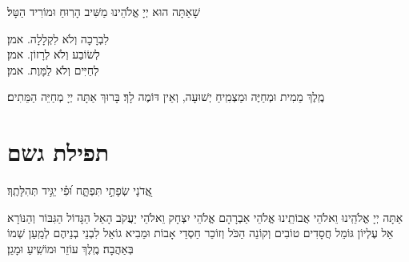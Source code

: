 \documentclass[twoside, openany, parskip=half, 11pt]{book}
\begin{document}
\begin{large}
שָׁאַתָּה הוּא יְיָ אֱלֹהֵינוּ מַשִּׁיב הָרֽוּחַ וּמוֹרִיד הַטָּל׃

לִבְרָכָה וְלֹא לִקְלָלָה. \hfill אמן׃\\
לְשׂוֹבַע וְלֹא לְרָזוֹן. \hfill אמן׃\\
לְחַיִּים וְלֹא לַמָּוֶת. \hfill אמן׃

\end{large}


מֶֽלֶךְ מֵמִית וּמְחַיֶּה וּמַצְמִֽיחַ יְשׁוּעָה, וְאֵין דּוֹמֶה לָךְ׃ בָּרוּךְ אַתָּה יְיָ מְחַיֵּה הַמֵּתִים׃





\section[תפילת גשם]{ תפילת גשם }

\label{tefilasgeshem}


\begin{small}
אֲ֭דֹנָי שְׂפָתַ֣י תִּפְתָּ֑ח וּ֝פִ֗י יַגִּ֥יד תְּהִלָּתֶֽךָ׃\\
\end{small}
אַתָּה יְיָ אֱלֹהֵֽינוּ וֵאלֹהֵי אֲבוֹתֵֽינוּ אֱלֹהֵי אַבְרָהָם אֱלֹהֵי יִצְחָק וֵאלֹהֵי יַעֲקֹב הָאֵל הַגָּדוֹל הַגִּבּוֹר וְהַנּוֹרָא אֵל עֶלְיוֹן גּוֹמֵל חֲסָדִים טוֹבִים וְקוֹנֵה הַכֹּל וְזוֹכֵר חַסְדֵי אָבוֹת וּמֵבִיא גוֹאֵל לִבְנֵי בְנֵיהֶם לְמַֽעַן שְׁמוֹ בְּאַהֲבָה׃ מֶֽלֶךְ עוֹזֵר וּמוֹשִֽׁיעַ וּמָגֵן׃

\newenvironment{nstabbing}
{\setlength{\topsep}{0pt}%
\setlength{\partopsep}{0pt}%
\tabbing}
{\endtabbing}


\end{document}
